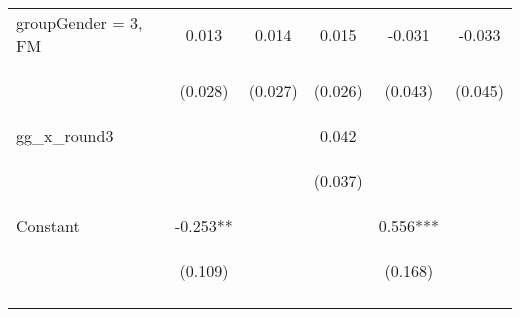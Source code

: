 \begin{center}
\begin{tabular}{lccccc}
groupGender = 3, FM & 0.013 & 0.014 & 0.015 & -0.031 & -0.033 \\
\vspace{4pt} & \begin{footnotesize}(0.028)\end{footnotesize} & \begin{footnotesize}(0.027)\end{footnotesize} & \begin{footnotesize}(0.026)\end{footnotesize} & \begin{footnotesize}(0.043)\end{footnotesize} & \begin{footnotesize}(0.045)\end{footnotesize} \\
gg\_x\_round3 &  &  & 0.042 &  &  \\
\vspace{4pt} & \begin{footnotesize}\end{footnotesize} & \begin{footnotesize}\end{footnotesize} & \begin{footnotesize}(0.037)\end{footnotesize} & \begin{footnotesize}\end{footnotesize} & \begin{footnotesize}\end{footnotesize} \\
Constant & -0.253** &  &  & 0.556*** &  \\
 & \begin{footnotesize}(0.109)\end{footnotesize} & \begin{footnotesize}\end{footnotesize} & \begin{footnotesize}\end{footnotesize} & \begin{footnotesize}(0.168)\end{footnotesize} & \begin{footnotesize}\end{footnotesize} \\
\vspace{4pt} & \begin{footnotesize}\end{footnotesize} & \begin{footnotesize}\end{footnotesize} & \begin{footnotesize}\end{footnotesize} & \begin{footnotesize}\end{footnotesize} & \begin{footnotesize}\end{footnotesize} \\

\end{tabular}
\end{center}
